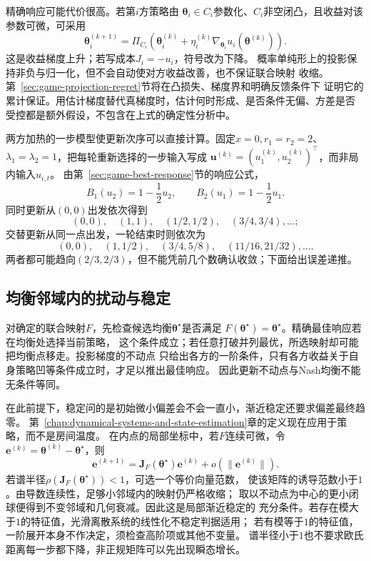 精确响应可能代价很高。若第\(i\)方策略由
\(\bm\theta_i\in C_i\)参数化、\(C_i\)非空闭凸，且收益对该参数可微，可采用
\begin{equation}
  \bm\theta_i^{(k+1)}
  =\Pi_{C_i}\left(
    \bm\theta_i^{(k)}
    +\eta_i^{(k)}
    \nabla_{\bm\theta_i}u_i(\bm\theta^{(k)})
  \right).
  \label{eq:game-simultaneous-gradient}
\end{equation}
这是收益梯度上升；若写成本\(J_i=-u_i\)，符号改为下降。
概率单纯形上的投影保持非负与归一化，但不会自动使对方收益改善，也不保证联合映射
收缩。第~\ref{sec:game-projection-regret}节将在凸损失、梯度界和明确反馈条件下
证明它的累计保证。用估计梯度替代真梯度时，估计何时形成、是否条件无偏、方差是否
受控都是额外假设，不包含在上式的确定性分析中。

两方加热的一步模型使更新次序可以直接计算。固定\(x=0,r_1=r_2=2\)、
\(\lambda_1=\lambda_2=1\)，把每轮重新选择的一步输入写成
\(\bm u^{(k)}=(u_1^{(k)},u_2^{(k)})^\top\)，而非局内输入\(u_{i,t}\)。
由第~\ref{sec:game-best-response}节的响应公式，
\[
  B_1(u_2)=1-\frac12u_2,\qquad
  B_2(u_1)=1-\frac12u_1.
\]
同时更新从\((0,0)\)出发依次得到
\[
  (0,0),\quad (1,1),\quad (1/2,1/2),\quad(3/4,3/4),\ldots;
\]
交替更新从同一点出发，一轮结束时则依次为
\[
  (0,0),\quad(1,1/2),\quad(3/4,5/8),\quad(11/16,21/32),\ldots.
\]
两者都可能趋向\((2/3,2/3)\)，但不能凭前几个数确认收敛；下面给出误差递推。

\subsection{均衡邻域内的扰动与稳定}
\label{sec:game-local-stability}

对确定的联合映射\(F\)，先检查候选均衡\(\bm\theta^\star\)是否满足
\(F(\bm\theta^\star)=\bm\theta^\star\)。精确最佳响应若在均衡处选择当前策略，
这个条件成立；若任意打破并列最优，所选映射却可能把均衡点移走。投影梯度的不动点
只给出各方的一阶条件，只有各方收益关于自身策略凹等条件成立时，才足以推出最佳响应。
因此更新不动点与Nash均衡不能无条件等同。

在此前提下，稳定问的是初始微小偏差会不会一直小，渐近稳定还要求偏差最终趋零。
第~\ref{chap:dynamical-systems-and-state-estimation}章的定义现在应用于策略，而不是房间温度。
在内点的局部坐标中，若\(F\)连续可微，令
\(\bm e^{(k)}=\bm\theta^{(k)}-\bm\theta^\star\)，则
\[
  \bm e^{(k+1)}
  =\bm J_F(\bm\theta^\star)\bm e^{(k)}
    +o(\|\bm e^{(k)}\|).
\]
若谱半径\(\rho(\bm J_F(\bm\theta^\star))<1\)，可选一个等价向量范数，
使该矩阵的诱导范数小于\(1\)。由导数连续性，足够小邻域内的映射仍严格收缩；
取以不动点为中心的更小闭球便得到不变邻域和几何衰减。因此这是局部渐近稳定的
充分条件。若存在模大于\(1\)的特征值，光滑离散系统的线性化不稳定判据适用；
若有模等于\(1\)的特征值，一阶展开本身不作决定，须检查高阶项或其他不变量。
谱半径小于\(1\)也不要求欧氏距离每一步都下降，非正规矩阵可以先出现瞬态增长。

